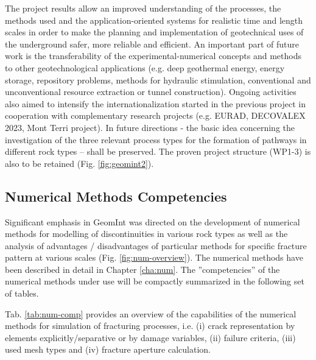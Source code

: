 The project results allow an improved understanding of the processes, the methods used and the application-oriented systems for realistic time and length scales in order to make the planning and implementation of geotechnical uses of the underground safer, more reliable and efficient. An important part of future work is the transferability of the experimental-numerical concepts and methods to other geotechnological applications (e.g. deep geothermal energy, energy storage, repository problems, methods for hydraulic stimulation, conventional and unconventional resource extraction or tunnel construction). Ongoing activities also aimed to intensify the internationalization started in the previous project in cooperation with complementary research projects (e.g. EURAD, DECOVALEX 2023, Mont Terri project).
%
In future directions - the basic idea concerning the investigation of the three relevant process types for the formation of pathways in different rock types -- shall be preserved. The proven project structure (WP1-3) is also to be retained (Fig. \ref{fig:geomint2}).

\subsection{Numerical Methods Competencies}
\label{sec:synthesis-num}

Significant emphasis in GeomInt was directed on the development of numerical methods for modelling of discontinuities in various rock types as well as the analysis of advantages / disadvantages of particular methods for specific fracture pattern at various scales (Fig. \ref{fig:num-overview}). The numerical methods have been described in detail in Chapter \ref{cha:num}. The ''competencies'' of the numerical methods under use will be compactly summarized in the following set of tables.

Tab. \ref{tab:num-comp} provides an overview of the capabilities of the numerical methods for simulation of fracturing processes, i.e. (i) crack representation by elements explicitly/separative or by damage variables, (ii) failure criteria, (iii) used mesh types and (iv) fracture aperture calculation.

